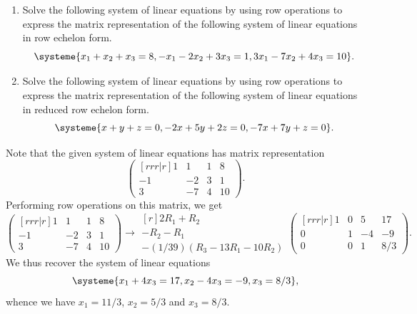 \begin{problem}
    \begin{enumerate}
        \item Solve the following system of linear equations by using row operations to express the matrix representation of the following system of linear equations in row echelon form. \[\systeme{x_1 + x_2 + x_3 = 8, -x_1 - 2x_2 + 3x_3 = 1, 3x_1 - 7x_2 + 4x_3 = 10}.\]
        \item Solve the following system of linear equations by using row operations to express the matrix representation of the following system of linear equations in reduced row echelon form. \[\systeme{x + y + z = 0, -2x + 5y + 2z = 0, -7x+7y+z = 0}.\]
    \end{enumerate}
\end{problem}
\begin{solution}
    \begin{ppart}
        Note that the given system of linear equations has matrix representation \[\begin{pmatrix}[rrr|r]1 & 1 & 1 & 8\\ -1 & -2 & 3 & 1 \\ 3 & -7 & 4 & 10\end{pmatrix}.\] Performing row operations on this matrix, we get \[\begin{pmatrix}[rrr|r]1 & 1 & 1 & 8\\ -1 & -2 & 3 & 1 \\ 3 & -7 & 4 & 10\end{pmatrix} \rightarrow \begin{matrix}[r]\scriptstyle 2R_1 + R_2 \\ \scriptstyle -R_2 - R_1 \\ \scriptstyle -(1/39)(R_3 - 13R_1 - 10 R_2)\end{matrix}\begin{pmatrix}[rrr|r]1 & 0 & 5 & 17\\ 0 & 1 & -4 & -9 \\ 0 & 0 & 1 & 8/3\end{pmatrix}.\] We thus recover the system of linear equations \[\systeme{x_1 + 4x_3 = 17, x_2 - 4x_3 = -9, x_3 = 8/3},\] whence we have $x_1 = 11/3$, $x_2 = 5/3$ and $x_3 = 8/3$.
    \end{ppart}
    \begin{ppart}

\end{ppart}
\end{solution}
